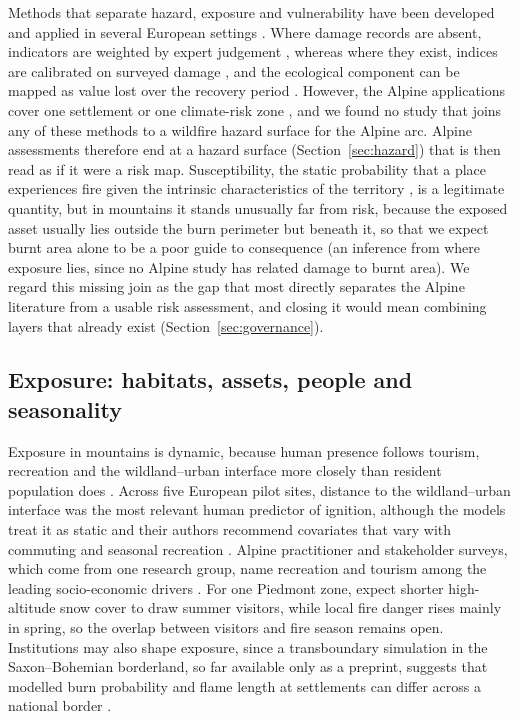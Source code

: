 \documentclass[11pt,a4paper]{article}
\begin{document}
Methods that separate hazard, exposure and vulnerability have been developed and applied in several European settings \citep{papathomakohle_towards_2025, papathomakohle_wildfire_2022, riviere_mapping_2023, arrogantefunes_mapping_2024, lecinadiaz_assessing_2021, pede_mountain_2022}. Where damage records are absent, indicators are weighted by expert judgement \citep{papathomakohle_towards_2025}, whereas where they exist, indices are calibrated on surveyed damage \citep{papathomakohle_wildfire_2022}, and the ecological component can be mapped as value lost over the recovery period \citep{arrogantefunes_mapping_2024}. However, the Alpine applications cover one settlement \citep{papathomakohle_towards_2025} or one climate-risk zone \citep{pede_mountain_2022}, and we found no study that joins any of these methods to a wildfire hazard surface for the Alpine arc. Alpine assessments therefore end at a hazard surface (Section~\ref{sec:hazard}) that is then read as if it were a risk map. Susceptibility, the static probability that a place experiences fire given the intrinsic characteristics of the territory \citep{trucchia_defining_2022}, is a legitimate quantity, but in mountains it stands unusually far from risk, because the exposed asset usually lies outside the burn perimeter but beneath it, so that we expect burnt area alone to be a poor guide to consequence (an inference from where exposure lies, since no Alpine study has related damage to burnt area). We regard this missing join as the gap that most directly separates the Alpine literature from a usable risk assessment, and closing it would mean combining layers that already exist (Section~\ref{sec:governance}).

\subsection{Exposure: habitats, assets, people and seasonality}

Exposure in mountains is dynamic, because human presence follows tourism, recreation and the wildland--urban interface more closely than resident population does \citep{gelabert_assessing_2025, pede_mountain_2022, muller_forest_2020, hoang_stakeholders_2026}. Across five European pilot sites, distance to the wildland--urban interface was the most relevant human predictor of ignition, although the models treat it as static and their authors recommend covariates that vary with commuting and seasonal recreation \citep{gelabert_assessing_2025}. Alpine practitioner and stakeholder surveys, which come from one research group, name recreation and tourism among the leading socio-economic drivers \citep{muller_forest_2020, hoang_stakeholders_2026}. For one Piedmont zone, \citet{pede_mountain_2022} expect shorter high-altitude snow cover to draw summer visitors, while local fire danger rises mainly in spring, so the overlap between visitors and fire season remains open. Institutions may also shape exposure, since a transboundary simulation in the Saxon--Bohemian borderland, so far available only as a preprint, suggests that modelled burn probability and flame length at settlements can differ across a national border \citep{avouris_exposure_2025}.
\end{document}
